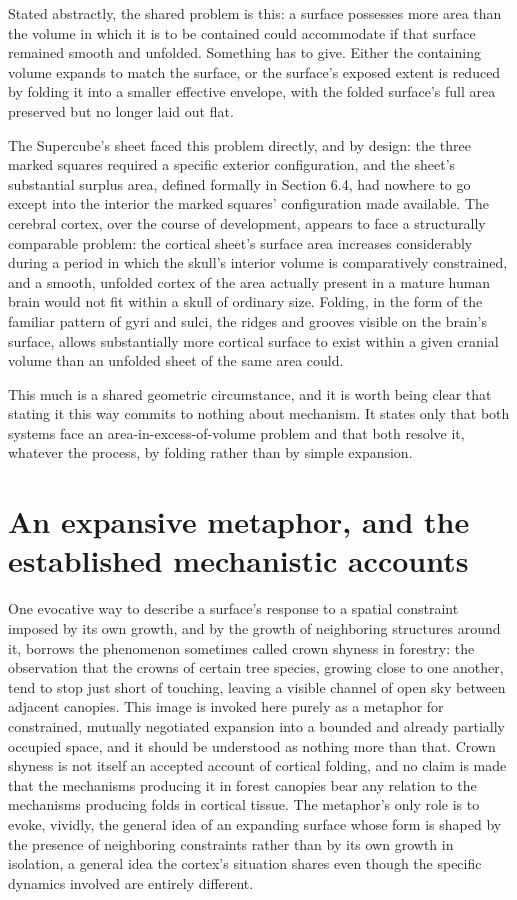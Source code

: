 \documentclass[11pt,oneside]{book}
\begin{document}
Stated abstractly, the shared problem is this: a surface possesses more
area than the volume in which it is to be contained could accommodate if
that surface remained smooth and unfolded. Something has to give. Either
the containing volume expands to match the surface, or the surface's
exposed extent is reduced by folding it into a smaller effective
envelope, with the folded surface's full area preserved but no longer
laid out flat.

The Supercube's sheet faced this problem directly, and by design: the
three marked squares required a specific exterior configuration, and the
sheet's substantial surplus area, defined formally in Section 6.4, had
nowhere to go except into the interior the marked squares' configuration
made available. The cerebral cortex, over the course of development,
appears to face a structurally comparable problem: the cortical sheet's
surface area increases considerably during a period in which the skull's
interior volume is comparatively constrained, and a smooth, unfolded
cortex of the area actually present in a mature human brain would not
fit within a skull of ordinary size. Folding, in the form of the
familiar pattern of gyri and sulci, the ridges and grooves visible on
the brain's surface, allows substantially more cortical surface to exist
within a given cranial volume than an unfolded sheet of the same area
could.

This much is a shared geometric circumstance, and it is worth being
clear that stating it this way commits to nothing about mechanism. It
states only that both systems face an area-in-excess-of-volume problem
and that both resolve it, whatever the process, by folding rather than
by simple expansion.

\hypertarget{an-expansive-metaphor-and-the-established-mechanistic-accounts}{%
\section{An expansive metaphor, and the established mechanistic
accounts}\label{an-expansive-metaphor-and-the-established-mechanistic-accounts}}

One evocative way to describe a surface's response to a spatial
constraint imposed by its own growth, and by the growth of neighboring
structures around it, borrows the phenomenon sometimes called crown
shyness in forestry: the observation that the crowns of certain tree
species, growing close to one another, tend to stop just short of
touching, leaving a visible channel of open sky between adjacent
canopies. This image is invoked here purely as a metaphor for
constrained, mutually negotiated expansion into a bounded and already
partially occupied space, and it should be understood as nothing more
than that. Crown shyness is not itself an accepted account of cortical
folding, and no claim is made that the mechanisms producing it in forest
canopies bear any relation to the mechanisms producing folds in cortical
tissue. The metaphor's only role is to evoke, vividly, the general idea
of an expanding surface whose form is shaped by the presence of
neighboring constraints rather than by its own growth in isolation, a
general idea the cortex's situation shares even though the specific
dynamics involved are entirely different.
\end{document}
